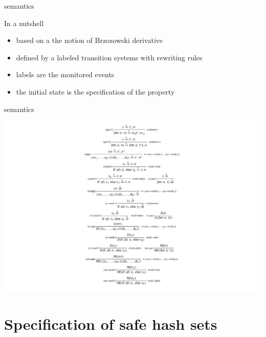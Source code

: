 \documentclass[10pt,usenames,dvipsnames]{beamer}
\begin{document}

\begin{frame}{\rml semantics}
  \begin{block}{In a nutshell}
    \begin{itemize}
    \item based on a the notion of Brzozowski derivative 
    \item defined by a labeled transition systems with rewriting rules
    \item labels are the monitored events
    \item the initial state is the specification of the property
    \end{itemize}
  \end{block}
\end{frame}


\begin{frame}{\rml semantics}
  \begin{center}
    \includegraphics[keepaspectratio,height=0.85\textheight]{images/semantics}
  \end{center}
\end{frame}


\section{Specification of safe hash sets}
\end{document}
